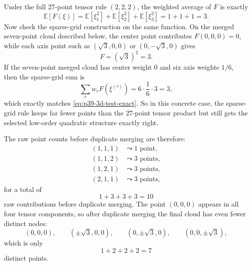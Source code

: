 \documentclass[11pt]{article}
\numberwithin{equation}{section}
\newcommand{\E}{\mathbb E}
\begin{document}
Under the full 27-point tensor rule \((2,2,2)\), the weighted average of
\(F\) is exactly
\begin{equation}
  \E[F(\xi)] = \E[\xi_1^2]+\E[\xi_2^2]+\E[\xi_3^2] = 1+1+1 = 3.
  \label{eq:p39-3d-test-exact}
\end{equation}
Now check the sparse-grid construction on the same function.  On the merged
seven-point cloud described below, the center point contributes
\(F(0,0,0)=0\), while each axis point such as \((\sqrt3,0,0)\) or
\((0,-\sqrt3,0)\) gives
\begin{equation}
  F = (\sqrt3)^2 = 3.
  \label{eq:p39-axis-value}
\end{equation}
If the seven-point merged cloud has center weight 0 and six axis weights
\(1/6\), then the sparse-grid sum is
\begin{equation}
  \sum_r w_rF(\xi^{(r)})
  = 6\cdot \frac16\cdot 3
  = 3,
  \label{eq:p39-3d-test-sparse-sum}
\end{equation}
which exactly matches \eqref{eq:p39-3d-test-exact}.  So in this concrete case,
the sparse-grid rule keeps far fewer points than the 27-point tensor product but
still gets the selected low-order quadratic structure exactly right.

The raw point counts before duplicate merging are therefore:
\begin{align}
  (1,1,1) &\leadsto 1 \text{ point},
  \label{eq:p37-3d-count-111}\\
  (1,1,2) &\leadsto 3 \text{ points},
  \label{eq:p37-3d-count-112}\\
  (1,2,1) &\leadsto 3 \text{ points},
  \label{eq:p37-3d-count-121}\\
  (2,1,1) &\leadsto 3 \text{ points},
  \label{eq:p37-3d-count-211}
\end{align}
for a total of
\begin{equation}
  1+3+3+3=10
  \label{eq:p37-3d-raw-count}
\end{equation}
raw contributions before duplicate merging.  The point \((0,0,0)\) appears in
all four tensor components, so after duplicate merging the final cloud has even
fewer distinct nodes:
\begin{equation}
  (0,0,0),
  \qquad
  (\pm\sqrt3,0,0),
  \qquad
  (0,\pm\sqrt3,0),
  \qquad
  (0,0,\pm\sqrt3),
  \label{eq:p37-3d-final-nodes}
\end{equation}
which is only
\begin{equation}
  1+2+2+2 = 7
  \label{eq:p37-3d-final-count}
\end{equation}
distinct points.
\end{document}
